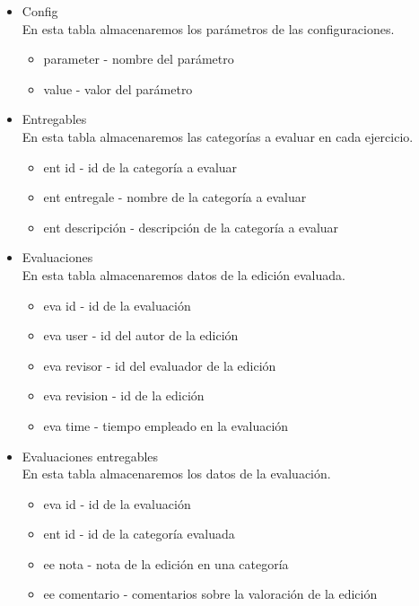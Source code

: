 \begin{itemize}	
	\item Config\\
	
	En esta tabla almacenaremos los parámetros de las configuraciones.
	
	\begin{itemize}
		\item parameter - nombre del parámetro
		\item value - valor del parámetro
	\end{itemize}
	
	\item Entregables\\
	
	En esta tabla almacenaremos las categorías a evaluar en cada ejercicio.
	
	\begin{itemize}
		\item ent id - id de la categoría a evaluar
		\item ent entregale - nombre de la categoría a evaluar
		\item ent descripción - descripción de la categoría a evaluar
	\end{itemize}
	
	\item Evaluaciones\\
	
	En esta tabla almacenaremos datos de la edición evaluada.
	
	\begin{itemize}
		\item eva id - id de la evaluación
		\item eva user - id del autor de la edición
		\item eva revisor - id del evaluador de la edición
		\item eva revision - id de la edición
		\item eva time - tiempo empleado en la evaluación
	\end{itemize}
	
	\item Evaluaciones entregables\\
	
	En esta tabla almacenaremos los datos de la evaluación.
	
	\begin{itemize}
		\item eva id - id de la evaluación
		\item ent id - id de la categoría evaluada
		\item ee nota - nota de la edición en una categoría
		\item ee comentario - comentarios sobre la valoración de la edición
	\end{itemize}
	

\end{itemize}
